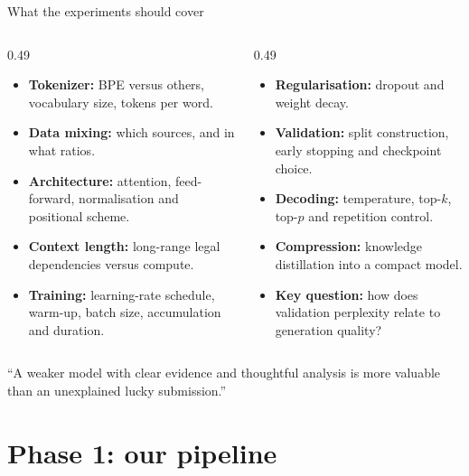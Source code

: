 \documentclass[aspectratio=169,11pt]{beamer}
\begin{document}
\begin{frame}{What the experiments should cover}
  \small
  \begin{columns}[T]
    \begin{column}{0.49\textwidth}
      \begin{itemize}
        \item \textbf{Tokenizer:} BPE versus others, vocabulary size, tokens per word.
        \item \textbf{Data mixing:} which sources, and in what ratios.
        \item \textbf{Architecture:} attention, feed-forward, normalisation and positional scheme.
        \item \textbf{Context length:} long-range legal dependencies versus compute.
        \item \textbf{Training:} learning-rate schedule, warm-up, batch size, accumulation and duration.
      \end{itemize}
    \end{column}
    \begin{column}{0.49\textwidth}
      \begin{itemize}
        \item \textbf{Regularisation:} dropout and weight decay.
        \item \textbf{Validation:} split construction, early stopping and checkpoint choice.
        \item \textbf{Decoding:} temperature, top-$k$, top-$p$ and repetition control.
        \item \textbf{Compression:} knowledge distillation into a compact model.
        \item \textbf{Key question:} how does validation perplexity relate to generation quality?
      \end{itemize}
    \end{column}
  \end{columns}
  \vspace{3mm}
  \begin{exampleblock}{}
    \centering ``A weaker model with clear evidence and thoughtful analysis is more valuable than an unexplained lucky submission.''
  \end{exampleblock}
\end{frame}

\section{Phase 1: our pipeline}
\end{document}
